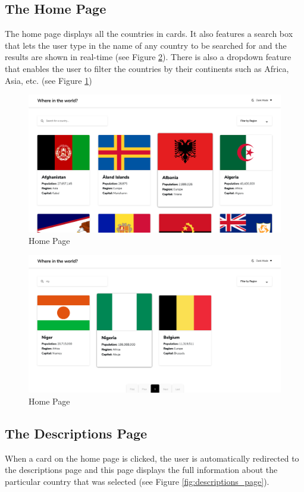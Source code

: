 \documentclass[twoside, a4paper, 12pt]{report}
\begin{document}
\subsection{The Home Page}
The home page displays all the countries in cards. It also features a search box that lets the user type in the name of any country to be searched for and the results are shown in real-time (see Figure \ref{fig:search}). There is also a dropdown feature that enables the user to filter the countries by their continents such as Africa, Asia, etc. (see Figure \ref{fig:home_page})

\begin{figure} [h]
	\centering
	\includegraphics[width=1.0\textwidth]{Home Page.png}
	\caption{Home Page}
	\label{fig:home_page}
\end{figure}

\begin{figure}
	\centering
	\includegraphics[width=1.0\textwidth]{search.png}
	\caption{Home Page}
	\label{fig:search}
\end{figure}

\subsection{The Descriptions Page}
When a card on the home page is clicked, the user is automatically redirected to the descriptions page and this page displays the full information about the particular country that was selected (see Figure \ref{fig:descriptions_page}).
\end{document}
